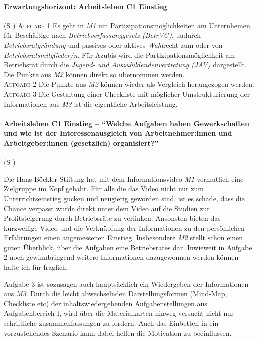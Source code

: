 \paragraph{Erwartungshorizont: Arbeitsleben C1 Einstieg} (\gls{S} \pageref{ARBEITSLEBEN-C1})
\textsc{Aufgabe 1} \quad Es geht in \emph{M1} um Partizipationsmöglichkeiten am Unternhemen für Beschäftige nach \emph{Betriebverfassunggesetz (BetrVG)}.  \Gls{ua}durch \emph{Betriebsratgründung} und passives oder aktives \emph{Wahl}recht zum oder von \emph{Betriebsratsmitglieder/n}. Für Azubis wird die Partizipationsmöglichkeit am Betriebsrat durch die \emph{Jugend- und Auszubildendenvertretung (JAV)} dargestellt. 
Die Punkte aus \emph{M2} können direkt so übernommen werden. \\ 

\textsc{Aufgabe 2} \quad Die Punkte aus \emph{M2} können wieder als Vergleich herangezogen werden. \\ 

\textsc{Aufgabe 3} \quad Die Gestaltung einer Checkliste mit möglicher Umstrukturierung der Informationen aus \emph{M3} ist die eigentliche Arbeitsleistung. 


\paragraph{Arbeitsleben C1 Einstieg -- \enquote{Welche Aufgaben haben Gewerkschaften und wie ist der Interessenausgleich von Arbeitnehmer:innen und Arbeitgeber:innen (gesetzlich) organisiert?}} (\gls{S} \pageref{ARBEITSLEBEN-C1})

Die Hans-Böckler-Stiftung hat mit dem Informationsvideo \emph{M1} vermutlich eine Zielgruppe im Kopf gehabt. Für alle die das Video nicht nur zum Unterrichtseinstieg gucken und neugierig geworden sind, ist es schade, dass die Chance verpasst wurde direkt unter dem Video auf die Studien zur Profitsteigerung durch Betriebsräte zu verlinken. 
Ansonsten bieten das kurzweilige Video und die Verknüpfung der Informationen zu den persönlichen Erfahrungen einen angemessenen Einstieg. 
Insbesondere \emph{M2} stellt schon einen guten Überblick, über die Aufgaben eine Betriebsrates dar. Inwieweit in Aufgabe 2 noch gewinnbringend weitere Informationen dazugewonnen werden können halte ich für fraglich. 

Aufgabe 3 ist sozusagen auch hauptsächlich ein Wiedergeben der Informationen aus \emph{M3}. Durch die leicht abwechselnden Darstellungsformen (Mind-Map, Checkliste \gls{etc}) der inhaltswiedergebenden Aufgabenstellungen aus Aufgabenbereich I, wird über die Materialkarten hinweg versucht nicht nur schriftliche zusammenfassungen zu fordern. Auch das Einbetten in ein vorzustellendes Szenario kann dabei helfen die Motivation zu beeinflussen. 



